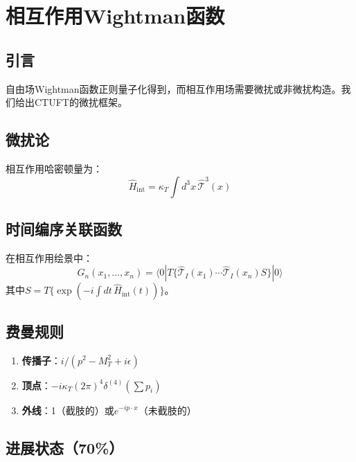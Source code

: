 \section{相互作用Wightman函数}
\label{sec:wightman_functions}

\subsection{引言}

自由场Wightman函数正则量子化得到，而相互作用场需要微扰或非微扰构造。我们给出CTUFT的微扰框架。

\subsection{微扰论}

相互作用哈密顿量为：
\begin{equation}
    \hat{H}_{\text{int}} = \kappa_T \int d^3x \, \hat{\mathcal{T}}^3(x)
\end{equation}

\subsection{时间编序关联函数}

在相互作用绘景中：
\begin{equation}
    G_n(x_1, \ldots, x_n) = \langle 0 | T\{\hat{\mathcal{T}}_I(x_1) \cdots \hat{\mathcal{T}}_I(x_n) S\} | 0 \rangle
\end{equation}
其中$S = T\{\exp(-i\int dt \, \hat{H}_{\text{int}}(t))\}$。

\subsection{费曼规则}

\begin{enumerate}
    \item \textbf{传播子}：$i/(p^2 - M_T^2 + i\epsilon)$
    \item \textbf{顶点}：$-i\kappa_T (2\pi)^4 \delta^{(4)}(\sum p_i)$
    \item \textbf{外线}：1（截肢的）或$e^{-ip\cdot x}$（未截肢的）
\end{enumerate}

\subsection{进展状态（70\%）}

